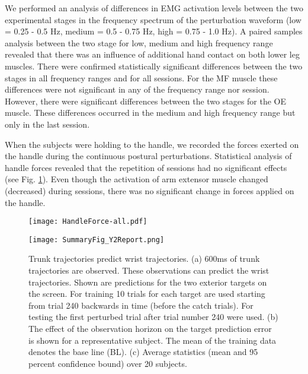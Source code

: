 We performed an analysis of differences in EMG activation levels between the two experimental stages in the frequency spectrum of the perturbation waveform (low = 0.25 - 0.5 Hz, medium = 0.5 - 0.75 Hz, high = 0.75 - 1.0 Hz). A paired samples analysis between the two stage for low, medium and high frequency range revealed that there was an influence of additional hand contact on both lower leg muscles. There were confirmed statistically significant differences between the two stages in all frequency ranges and for all sessions. For the MF muscle these differences were not significant in any of the frequency range nor session. However, there were significant differences between the two stages for the OE muscle. These differences occurred in the medium and high frequency range but only in the last session.

When the subjects were holding to the handle, we recorded the forces exerted on the handle during the continuous postural perturbations. Statistical analysis of handle forces revealed that the repetition of sessions had no significant effects (see Fig. \ref{fig:HandleForces}). Even though the activation of arm extensor muscle changed (decreased) during sessions, there was no significant change in forces applied on the handle.

\begin{figure}[!t]
	\begin{center}
		\texttt{[image: HandleForce-all.pdf]}
		\caption{}
		\label{fig:HandleForces}
	\end{center}
\end{figure}


\begin{figure}
\centering
\texttt{[image: SummaryFig\_Y2Report.png]}
\caption{Trunk trajectories predict wrist trajectories. (a) 600ms of trunk trajectories are observed. These observations can predict the wrist trajectories. Shown are predictions for the two exterior targets on the screen. For training 10 trials for each target are used starting from trial 240 backwards in time (before the catch trials). For testing the first perturbed trial after trial number 240 were used. (b) The effect of the observation horizon on the target prediction error is shown for a representative subject. The mean of the training data denotes the base line (BL). (c) Average statistics (mean and 95 percent confidence bound) over 20 subjects.
}
\label{fig:HumanProMPsPrediction}
\end{figure}

